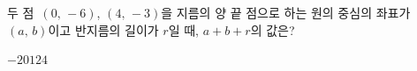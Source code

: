 두 점~$(0,\,-6)$, $(4,\,-3)$을 지름의 양 끝 점으로 하는 원의 중심의 좌표가 $(a,\,b)$이고 반지름의 길이가 $r$일 때, $a+b+r$의 값은?
\begin{choices32}{$-2$}{$0$}{$1$}{$2$}{$4$}\end{choices32}
